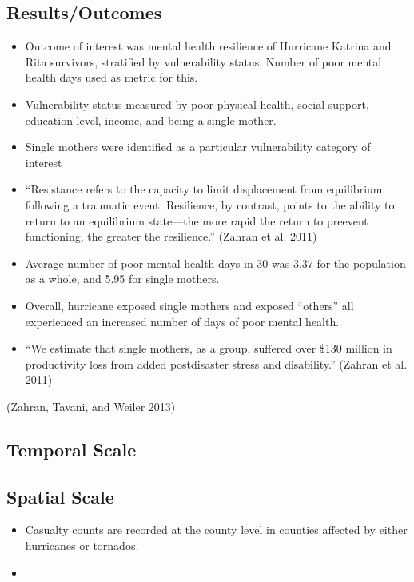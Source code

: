 \documentclass[
]{article}
\providecommand{\tightlist}{%
  \setlength{\itemsep}{0pt}\setlength{\parskip}{0pt}}
\begin{document}
\hypertarget{resultsoutcomes-8}{%
\subsection{Results/Outcomes}\label{resultsoutcomes-8}}

\begin{itemize}
\tightlist
\item
  Outcome of interest was mental health resilience of Hurricane Katrina
  and Rita survivors, stratified by vulnerability status. Number of poor
  mental health days used as metric for this.
\item
  Vulnerability status measured by poor physical health, social support,
  education level, income, and being a single mother.
\item
  Single mothers were identified as a particular vulnerability category
  of interest
\item
  ``Resistance refers to the capacity to limit displacement from
  equilibrium following a traumatic event. Resilience, by contrast,
  points to the ability to return to an equilibrium state---the more
  rapid the return to preevent functioning, the greater the
  resilience.'' (Zahran et al. 2011)
\item
  Average number of poor mental health days in 30 was 3.37 for the
  population as a whole, and 5.95 for single mothers.
\item
  Overall, hurricane exposed single mothers and exposed ``others'' all
  experienced an increased number of days of poor mental health.
\item
  ``We estimate that single mothers, as a group, suffered over \$130
  million in productivity loss from added postdisaster stress and
  disability.'' (Zahran et al. 2011)
\end{itemize}

(Zahran, Tavani, and Weiler 2013)

\hypertarget{temporal-scale-10}{%
\subsection{Temporal Scale}\label{temporal-scale-10}}

\hypertarget{spatial-scale-13}{%
\subsection{Spatial Scale}\label{spatial-scale-13}}

\begin{itemize}
\item
  Casualty counts are recorded at the county level in counties affected
  by either hurricanes or tornados.
\item
\end{itemize}
\end{document}
